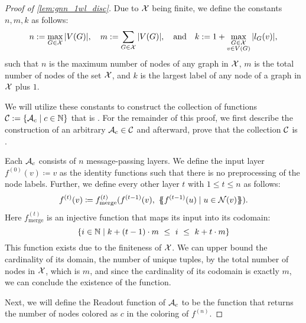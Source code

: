 \begin{proof}[Proof of \cref{lem:gnn_1wl_disc}]
    Due to $\mathcal{X}$ being finite, we define the constants $n, m, k$ as follows:
    \begin{equation*}
        n := \max_{G \in \mathcal{X}} |V(G)|, \quad  m := \sum_{G \in \mathcal{X}} |V(G)|, \quad\text{and}\quad k := 1 + \max_{\substack{G \in \mathcal{X} \\ v \in V(G)}} |l_G(v)|,
    \end{equation*}
    such that $n$ is the maximum number of nodes of any graph in $\mathcal{X}$, $m$ is the total number of nodes of the set $\mathcal{X}$, and $k$ is the largest label of any node of a graph in $\mathcal{X}$ plus $1$.

    We will utilize these constants to construct the collection of functions $\mathcal{C} := \{ \mathcal{A}_c \mid c \in \mathbb{N} \}$ that is \wldisc. For the remainder of this proof, we first describe the construction of an arbitrary $\mathcal{A}_c \in \mathcal{C}$ and afterward, prove that the collection $\mathcal{C}$ is \wldisc.

    Each $\mathcal{A}_c$ consists of $n$ message-passing layers. We define the input layer $f^{(0)}(v) \coloneqq v$ as the identity functions such that there is no preprocessing of the node labels. Further, we define every other layer $t$ with $1 \leq t \leq n$ as follows:
    \begin{align*}
        f^{(t)}(v) \coloneqq f^{(t)}_{\text{merge}}(f^{(t-1)}(v), \ \MSopen f^{(t-1)}(u) \mid u \in \cN(v)\MSclose).
    \end{align*}
    Here $f^{(t)}_{\text{merge}}$ is an injective function that maps its input into its codomain:
    \begin{equation*}
       \{ i \in \Nb \mid k + (t-1) \cdot m \ \leq \  i \ \leq \ k + t \cdot m \}
    \end{equation*}
    This function exists due to the finiteness of $\mathcal{X}$. We can upper bound the cardinality of its domain, the number of unique tuples, by the total number of nodes in $\mathcal{X}$, which is $m$, and since the cardinality of its codomain is exactly $m$, we can conclude the existence of the function.

    Next, we will define the \textsf{Readout} function of $\mathcal{A}_c$ to be the function that returns the number of nodes colored as $c$ in the coloring of $f^{(n)}$.
    

\end{proof}

